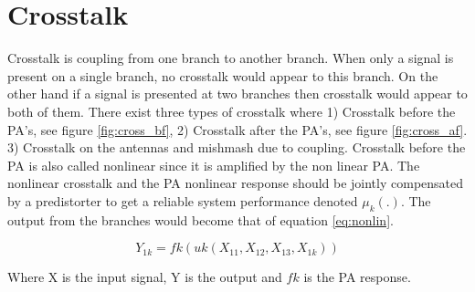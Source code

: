 \section{Crosstalk}
Crosstalk is coupling from one branch to another branch. When only a signal is present on a single branch, no crosstalk would appear to this branch. On the other hand if a signal is presented at two branches then crosstalk would appear to both of them. There exist three types of crosstalk where 1) Crosstalk before the PA's, see figure \ref{fig:cross_bf}, 2) Crosstalk after the PA's, see figure \ref{fig:cross_af}. 3) Crosstalk on the antennas and mishmash due to coupling. Crosstalk before the PA is also called nonlinear since it is amplified by the non linear PA. The nonlinear crosstalk and the PA nonlinear response should be jointly
compensated by a predistorter to get a reliable system performance \citep{islam2017} denoted $\mu_k (.)$. The output from the branches would become that of equation \ref{eq:nonlin}.

\begin{equation} \label{eq:nonlin}
Y_{1k} = fk(uk(X_{11},X_{12},X_{13},X_{1k}))
\end{equation}   

Where X is the input signal, Y is the output and $fk$ is the PA response. 

